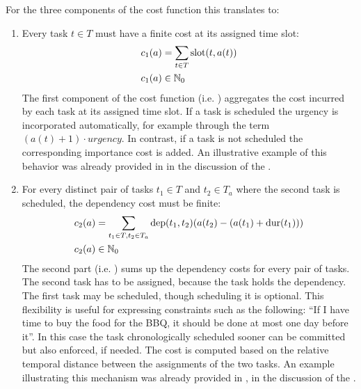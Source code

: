 \begin{itemize}
            For the three components of the cost function this translates to:
            \begin{enumerate}
                  \item Every task $t \in T$ must have a finite cost at its assigned time slot:
                        \begin{align}
                              c_1(a) & = \sum_{t \in T} \operatorname{slot}(t, a(t)) \label{eq:cost-function-1} \\
                              c_1(a) & \in \mathbb{N}_0 \notag
                        \end{align}
                        The first component of the cost function (i.e. ) aggregates the cost incurred by each task at its assigned time slot. If a task is scheduled the urgency is incorporated automatically, for example through the term $(a(t) + 1) \cdot \textit{urgency}$. In contrast, if a task is not scheduled the corresponding importance cost is added. An illustrative example of this behavior was already provided in  in the discussion of the .

                  \item For every distinct pair of tasks $t_1 \in T$ and $t_2 \in T_a$ where the second task is scheduled, the dependency cost must be finite:
                        \begin{align}
                              c_2(a) & = \sum_{t_1 \in T, t_2 \in T_a} \operatorname{dep}(t_1, t_2)(a(t_2) - (a(t_1) + \operatorname{dur}(t_1)))   \label{eq:cost-function-2} \\
                              c_2(a) & \in \mathbb{N}_0 \notag
                        \end{align}
                        The second part (i.e. ) sums up the dependency costs for every pair of tasks. The second task has to be assigned, because the task holds the dependency. The first task may be scheduled, though scheduling it is optional. This flexibility is useful for expressing constraints such as the following: ``If I have time to buy the food for the \ac{BBQ}, it should be done at most one day before it''. In this case the task chronologically scheduled sooner can be committed but also enforced, if needed. The cost is computed based on the relative temporal distance between the assignments of the two tasks. An example illustrating this mechanism was already provided in , in the discussion of the .


\end{enumerate}
\end{itemize}
